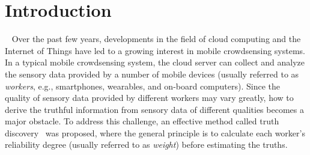 \documentclass[conference]{IEEEtran}
\begin{document}
\section{Introduction}~\label{sec1}
Over the past few years, developments in the field of cloud computing and the Internet of Things have led to a growing interest in mobile crowdsensing systems.
In a typical mobile crowdsensing system, the cloud server can collect and analyze the sensory data provided by a number of mobile devices (usually referred to as {\em workers}, e.g., smartphones, wearables, and on-board computers).
Since the quality of sensory data provided by different workers may vary greatly, how to derive the truthful information from sensory data of different qualities becomes a major obstacle.
To address this challenge, an effective method called truth discovery~\cite{li_resolving_2014,li_confidence-aware_2014} was proposed, where the general principle is to calculate each worker's reliability degree (usually referred to as {\em weight}) before estimating the truths.
\end{document}
